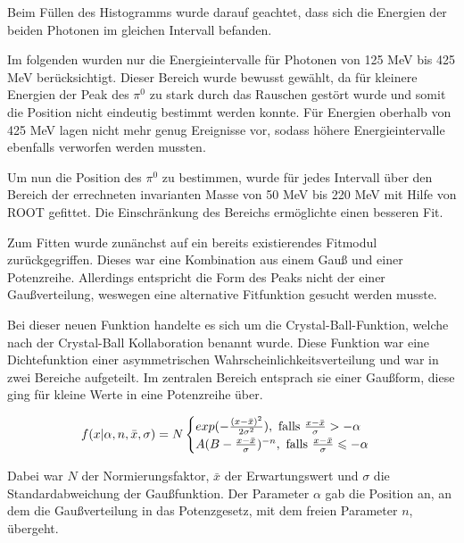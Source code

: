 \documentclass[a4paper,11pt,oneside,final,german,openbib,pdftex]{scrbook}
\begin{document}
{Beim Füllen des Histogramms wurde darauf geachtet, dass sich die Energien der beiden Photonen im gleichen Intervall befanden.

Im folgenden wurden nur die Energieintervalle f\"ur Photonen von 125 MeV bis 425 MeV ber\"ucksichtigt.
Dieser Bereich wurde bewusst gew\"ahlt, da f\"ur kleinere Energien der Peak des $\pi^0$ zu stark durch das Rauschen gest\"ort wurde und somit die Position nicht eindeutig bestimmt werden konnte. F\"ur Energien oberhalb von 425 MeV lagen nicht mehr genug Ereignisse vor, sodass h\"ohere Energieintervalle ebenfalls verworfen werden mussten. 


Um nun die Position des $\pi^0$ zu bestimmen, wurde für jedes Intervall über den Bereich der errechneten invarianten Masse von 50 MeV bis 220 MeV mit Hilfe von ROOT gefittet. Die Einschr\"ankung des Bereichs erm\"oglichte einen besseren Fit.



 Zum Fitten wurde zun\"anchst auf ein bereits existierendes Fitmodul zur\"uckgegriffen. Dieses war eine Kombination aus einem Gau{\ss} und einer Potenzreihe. Allerdings entspricht die Form des Peaks nicht der einer Gau{\ss}verteilung, weswegen eine alternative Fitfunktion gesucht werden musste. 
 
 Bei dieser neuen Funktion handelte es sich um die Crystal-Ball-Funktion, welche nach der Crystal-Ball Kollaboration benannt wurde. Diese Funktion war eine Dichtefunktion einer asymmetrischen Wahrscheinlichkeitsverteilung und war in zwei Bereiche aufgeteilt. Im zentralen Bereich entsprach sie einer Gau{\ss}form, diese ging f\"ur kleine Werte in eine Potenzreihe \"uber.
 
 \begin{equation}
 f(x|\alpha,n,\bar{x},\sigma)=N\begin{cases}exp(-\frac{(x-\bar{x})^2}{2\sigma^2}), \textnormal{  falls $\frac{x-\bar{x}}{\sigma}> -\alpha$} \\
 A(B-\frac{x-\bar{x}}{\sigma})^{-n}, \textnormal{  falls $\frac{x-\bar{x}}{\sigma}\leqslant -\alpha$} 
 \end{cases}
 \label{eq:Crystal-Ball-Funktion}
 \end{equation}
 
 Dabei war $N$ der Normierungsfaktor, $\bar{x}$ der Erwartungswert und $\sigma$ die Standardabweichung der Gau{\ss}funktion. Der Parameter $\alpha$ gab die Position an, an dem die Gau{\ss}verteilung in das Potenzgesetz, mit dem freien Parameter $n$, \"ubergeht\cite{NBI15}. 
 
}
\end{document}
